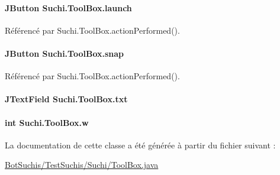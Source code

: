 \paragraph[{launch}]{\setlength{\rightskip}{0pt plus 5cm}J\+Button Suchi.\+Tool\+Box.\+launch\hspace{0.3cm}{\ttfamily [private]}}\label{classSuchi_1_1ToolBox_a63df00fa65553535385dc418ae03446d}


Référencé par Suchi.\+Tool\+Box.\+action\+Performed().

\hypertarget{classSuchi_1_1ToolBox_a9119a1e4848d392fae658022d9adb98f}{}
\paragraph[{snap}]{\setlength{\rightskip}{0pt plus 5cm}J\+Button Suchi.\+Tool\+Box.\+snap\hspace{0.3cm}{\ttfamily [private]}}\label{classSuchi_1_1ToolBox_a9119a1e4848d392fae658022d9adb98f}


Référencé par Suchi.\+Tool\+Box.\+action\+Performed().

\hypertarget{classSuchi_1_1ToolBox_a16b8d8a2117c1d472884f6246bc255bb}{}
\paragraph[{txt}]{\setlength{\rightskip}{0pt plus 5cm}J\+Text\+Field Suchi.\+Tool\+Box.\+txt\hspace{0.3cm}{\ttfamily [private]}}\label{classSuchi_1_1ToolBox_a16b8d8a2117c1d472884f6246bc255bb}
\hypertarget{classSuchi_1_1ToolBox_a8fc292a04350a271a813ce27967a1671}{}
\paragraph[{w}]{\setlength{\rightskip}{0pt plus 5cm}int Suchi.\+Tool\+Box.\+w\hspace{0.3cm}{\ttfamily [private]}}\label{classSuchi_1_1ToolBox_a8fc292a04350a271a813ce27967a1671}


La documentation de cette classe a été générée à partir du fichier suivant \+:\begin{DoxyCompactItemize}
\item 
\hyperlink{BotSuchis_2TestSuchis_2Suchi_2ToolBox_8java}{Bot\+Suchis/\+Test\+Suchis/\+Suchi/\+Tool\+Box.\+java}\end{DoxyCompactItemize}
